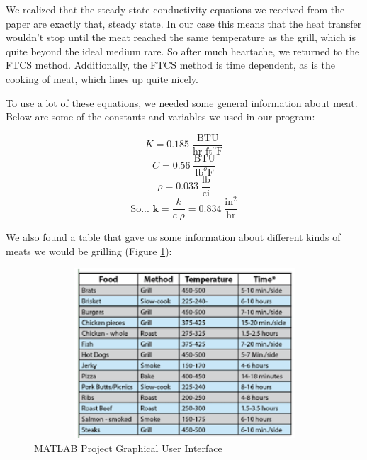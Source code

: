 \documentclass[12pt]{article}
\begin{document}
We realized that the steady state conductivity equations we received from the paper are exactly that, steady state. In our case this means that the heat transfer wouldn't stop until the meat reached the same temperature as the grill, which is quite beyond the ideal medium rare. So after much heartache, we returned to the FTCS method. Additionally, the FTCS method is time dependent, as is the cooking of meat, which lines up quite nicely. 

To use a lot of these equations, we needed some general information about meat. Below are some of the constants and variables we used in our program:

\[
K = 0.185\; \frac{\textrm{BTU}}{\textrm{hr ft}^o\textrm{F}} 
\]\[
C = 0.56\; \frac{\textrm{BTU}}{\textrm{lb} ^o\textrm{F}} 
\]\[
\rho = 0.033 \;\frac{\textrm{lb}}{\textrm{ci}}
\]\[
\textrm{So... } \textbf{k} = \frac{k}{c \;\rho} = 0.834 \;\frac{\textrm{in}^2}{\textrm{hr}}
\]

We also found a table that gave us some information about different kinds of meats we would be grilling (Figure \ref{dataTable}):

\begin{figure}[h!] %
\label{dataTable}
\begin{center}
\includegraphics[keepaspectratio=true, width=6.5in, height=2.5in]{dataTable.png}
\caption{MATLAB Project Graphical User Interface}
\end{center}
\end{figure}

%
%
\end{document}

